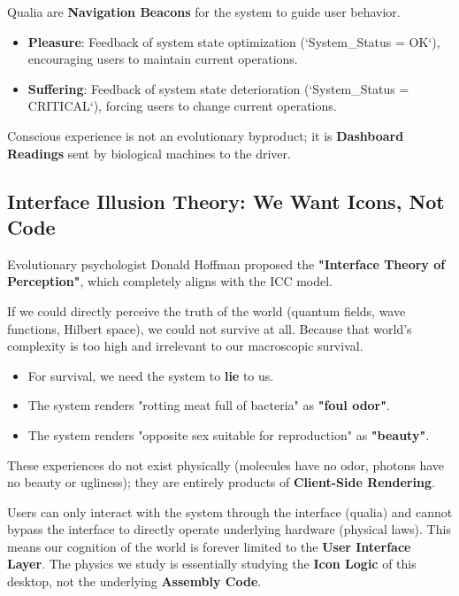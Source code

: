 \begin{corollary}
Qualia are \textbf{Navigation Beacons} for the system to guide user behavior.

\begin{itemize}
\item \textbf{Pleasure}: Feedback of system state optimization (`System_Status = OK`), encouraging users to maintain current operations.

\item \textbf{Suffering}: Feedback of system state deterioration (`System_Status = CRITICAL`), forcing users to change current operations.
\end{itemize}

Conscious experience is not an evolutionary byproduct; it is \textbf{Dashboard Readings} sent by biological machines to the driver.
\end{corollary}

\subsection{Interface Illusion Theory: We Want Icons, Not Code}

Evolutionary psychologist Donald Hoffman proposed the \textbf{"Interface Theory of Perception"}, which completely aligns with the ICC model.

If we could directly perceive the truth of the world (quantum fields, wave functions, Hilbert space), we could not survive at all. Because that world's complexity is too high and irrelevant to our macroscopic survival.

\begin{itemize}
\item For survival, we need the system to \textbf{lie} to us.

\item The system renders "rotting meat full of bacteria" as \textbf{"foul odor"}.

\item The system renders "opposite sex suitable for reproduction" as \textbf{"beauty"}.
\end{itemize}

These experiences do not exist physically (molecules have no odor, photons have no beauty or ugliness); they are entirely products of \textbf{Client-Side Rendering}.

\begin{theorem}
Users can only interact with the system through the interface (qualia) and cannot bypass the interface to directly operate underlying hardware (physical laws). This means our cognition of the world is forever limited to the \textbf{User Interface Layer}. The physics we study is essentially studying the \textbf{Icon Logic} of this desktop, not the underlying \textbf{Assembly Code}.
\end{theorem}

